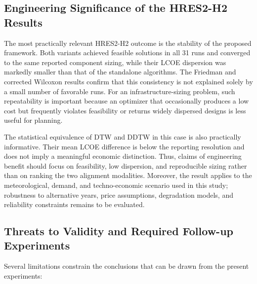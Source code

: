 \subsection{Engineering Significance of the HRES2-H2 Results}
\label{sec:discussion_hres2}

The most practically relevant HRES2-H2 outcome is the stability of the proposed framework. Both variants achieved feasible solutions in all 31 runs and converged to the same reported component sizing, while their LCOE dispersion was markedly smaller than that of the standalone algorithms. The Friedman and corrected Wilcoxon results confirm that this consistency is not explained solely by a small number of favorable runs. For an infrastructure-sizing problem, such repeatability is important because an optimizer that occasionally produces a low cost but frequently violates feasibility or returns widely dispersed designs is less useful for planning.

The statistical equivalence of DTW and DDTW in this case is also practically informative. Their mean LCOE difference is below the reporting resolution and does not imply a meaningful economic distinction. Thus, claims of engineering benefit should focus on feasibility, low dispersion, and reproducible sizing rather than on ranking the two alignment modalities. Moreover, the result applies to the meteorological, demand, and techno-economic scenario used in this study; robustness to alternative years, price assumptions, degradation models, and reliability constraints remains to be evaluated.

\subsection{Threats to Validity and Required Follow-up Experiments}
\label{sec:discussion_validity}

Several limitations constrain the conclusions that can be drawn from the present experiments:

